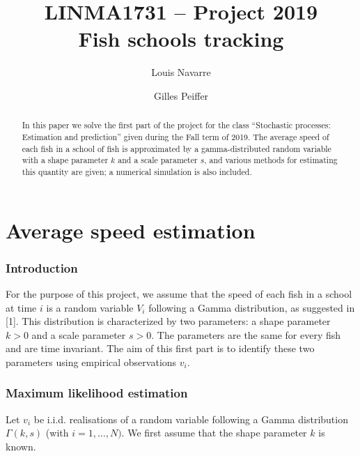 \documentclass[final]{aomart}
\title[Fish schools tracking]{LINMA1731 -- Project 2019\\
Fish schools tracking}
\author{Louis Navarre}
\author{Gilles Peiffer}
\newtheorem[{}\it]{thm}{Theorem}[section]
\theoremstyle{definition}
\newtheorem*[{}\it]{notation}{Notation}
\numberwithin{equation}{section}
\begin{document}
\begin{abstract}
	In this paper we solve the first part of the project for the class ``Stochastic processes: Estimation and prediction'' given during the Fall term of 2019.
	The average speed of each fish in a school of fish is approximated by a gamma-distributed random variable with a shape parameter \(k\) and a scale parameter \(s\), and various methods for estimating this quantity are given; a numerical simulation is also included.
\end{abstract}

\maketitle
\tableofcontents

\part{Average speed estimation}
\section{Introduction}
For the purpose of this project, we assume that the speed of each fish in a school
at time \(i\) is a random variable \(V_i\) following a Gamma distribution, as suggested in [1].
This distribution is characterized by two parameters:
a shape parameter \(k > 0\) and a scale parameter \(s > 0\).
The parameters are the same for every fish and are time invariant.
The aim of this first part is to identify these two parameters using empirical observations \(v_i\).

\section{Maximum likelihood estimation}
Let \(v_i\) be i.i.d. realisations of a random variable following a Gamma distribution \(\Gamma(k, s)\) (with \(i = 1,\ldots, N)\).
We first assume that the shape parameter \(k\) is known.
\end{document}
